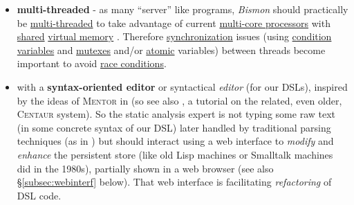 \begin{itemize}
      \item \textbf{multi-threaded} - as many ``server'' like
        programs, \emph{Bismon} should practically be
        \href{https://en.wikipedia.org/wiki/Thread_(computing)}{multi-threaded}
          to take
        advantage of current
        \href{https://en.wikipedia.org/wiki/Multi-core\_processor}{multi-core
          processors}  with
        \href{https://en.wikipedia.org/wiki/Shared\_memory}{shared}
        \href{https://en.wikipedia.org/wiki/Virtual\_memory}{virtual
          memory} 
         . Therefore
        \href{https://en.wikipedia.org/wiki/Synchronization}{synchronization}
        issues (using
        \href{https://computing.llnl.gov/tutorials/pthreads/#ConVarSignal}{condition
          variables}  and
        \href{https://computing.llnl.gov/tutorials/pthreads/#MutexLocking}{mutexes}
         and/or
        \href{https://en.wikipedia.org/wiki/Atomic\_semantics}{atomic}
        variables)  between threads become
        important to avoid 
        \href{https://en.wikipedia.org/wiki/Race\_condition}{race
          conditions}.

      \item with a \textbf{syntax-oriented editor} or syntactical
        \emph{editor} 
         (for our DSLs), inspired by the
        ideas of \textsc{Mentor} 
        in \cite{donzeaugouge:inria-mentor} (so see also
        \cite{Jacobs:1992:Centaur}, a tutorial on the related, even
        older, \textsc{Centaur}  system). So the static analysis expert
          is not
        typing some raw text (in some concrete syntax of our
         DSL) later handled by traditional parsing
        techniques (as in \cite{Aho:2006:DragonBook}) but should
        interact using a web interface to \emph{modify} and
        \emph{enhance} the persistent store (like old Lisp machines or
        Smalltalk machines did in the 1980s), partially shown in a web
        browser (see also \S\ref{subsec:webinterf} below). That web
        interface is facilitating \emph{refactoring} of DSL code.
\end{itemize}

